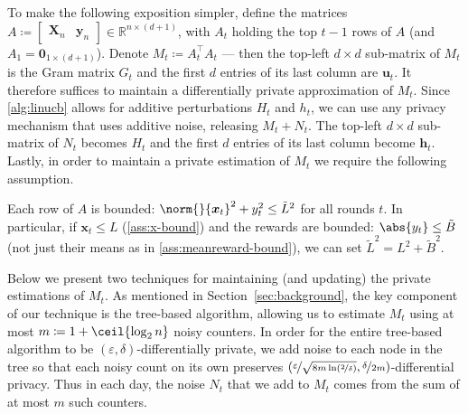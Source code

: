 \documentclass{article}
\renewcommand{\vec}[1]{\bm{#1}}
\newcommand{\defeq}{\coloneq}
\newcommand{\Real}{\mathds{R}}
\DeclarePairedDelimiter{\abs}||
\DeclarePairedDelimiter{\ceil}\lceil\rceil
\providecommand\transp{\top}
\let\transpsymbol\transp
\renewcommand{\transp}[1]{#1^\transpsymbol}
\newcommand{\XtX}[1]{\transp{#1}{#1}}
\begin{document}
To make the following exposition simpler, define the matrices
$A \defeq \begin{bmatrix} \vec X_n & \vec y_n \end{bmatrix} \in
\Real^{n\times(d+1)}$, with $A_t$ holding the top $t-1$ rows of $A$
(and $A_1 = \vec 0_{1\times(d+1)}$).  Denote $M_t \defeq \XtX{A_t}$
--- then the top-left $d\times d$ sub-matrix of $M_t$ is the Gram
matrix $G_t$ and the first $d$ entries of its last column are
$\vec u_t$.  It therefore suffices to maintain a differentially
private approximation of $M_t$. Since \cref{alg:linucb} allows for
additive perturbations $H_t$ and $h_t$, we can use any privacy
mechanism that uses additive noise, releasing $M_t + N_t$.  The
top-left $d\times d$ sub-matrix of $N_t$ becomes $H_t$ and the first
$d$ entries of its last column become $\vec h_t$. Lastly, in order to
maintain a private estimation of $M_t$ we require the following
assumption.
\begin{assumption}\label{ass:bounded-data}
  Each row of $A$ is bounded:
  $\norm{}{\vec x_t}^2 + y_t^2 \le \tilde L^2$ for all rounds $t$.  In
  particular, if $\vec x_t \le L$ (\cref{ass:x-bound}) and
  the rewards are bounded: $\abs{y_t} \le \tilde B$ (not just their
  means as in \cref{ass:meanreward-bound}), we can set $\tilde L^2 = L^2 + \tilde B^2$.
\end{assumption}
Below we present two techniques for maintaining (and updating) the
private estimations of $M_t$. As mentioned in
Section~\ref{sec:background}, the key component of our technique is
the tree-based algorithm, allowing us to estimate $M_t$ using at most
$m \defeq 1 + \ceil{\log_2n}$ noisy counters. In order for the entire
tree-based algorithm to be $(\varepsilon,\delta)$-differentially
private, we add noise to each node in the tree so that each noisy
count on its own preserves
$(\nicefrac{\varepsilon}{\sqrt{8m\ln(\nicefrac{2}{\delta})}},
\nicefrac{\delta}{2m})$-differential privacy. Thus in each day, the
noise $N_t$ that we add to $M_t$ comes from the sum of at most $m$
such counters.


\end{document}
